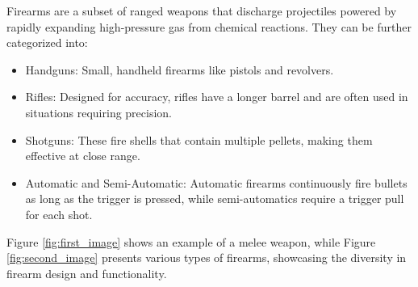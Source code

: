 Firearms are a subset of ranged weapons that discharge projectiles powered by rapidly expanding high-pressure gas 
from chemical reactions. They can be further categorized into:
\begin{itemize}
    \item Handguns: Small, handheld firearms like pistols and revolvers.
    \item Rifles: Designed for accuracy, rifles have a longer barrel and are often used in situations requiring precision.
    \item Shotguns: These fire shells that contain multiple pellets, making them effective at close range.
    \item Automatic and Semi-Automatic: Automatic firearms continuously fire bullets as long as the trigger is pressed, while semi-automatics require a trigger pull for each shot.
\end{itemize}

Figure \ref{fig:first_image} shows an example of a melee weapon, while 
Figure \ref{fig:second_image} presents various types of firearms, showcasing the diversity in firearm design and 
functionality.

